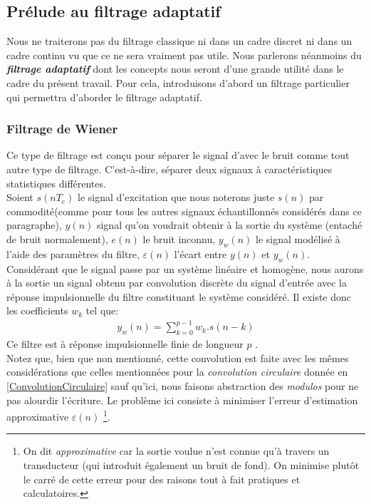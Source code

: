 \subsection{Prélude au filtrage adaptatif}
Nous ne traiterons pas du filtrage classique ni dans un cadre discret ni dans un cadre continu vu que ce ne sera vraiment pas utile. Nous parlerons néanmoins du \textbf{\emph{filtrage adaptatif}} dont les concepts nous seront d'une grande utilité dans le cadre du présent travail. Pour cela, introduisons d'abord un filtrage particulier qui permettra d'aborder le filtrage adaptatif.
\subsubsection{Filtrage de Wiener\cite{Fmy}}
Ce type de filtrage est conçu pour séparer le signal d'avec le bruit comme tout autre type de filtrage. C'est-à-dire, séparer deux signaux à caractéristiques statistiques différentes.\\
Soient $ s(nT_{e}) $ le signal d'excitation que nous noterons juste $ s(n) $ par commodité(comme pour tous les autres signaux échantillonnés considérés dans ce paragraphe), $ y(n) $ signal qu'on voudrait obtenir à la sortie du système (entaché de bruit normalement), $ e(n) $ le bruit inconnu, $ y_{w}(n) $ le signal modélisé à l'aide des paramètres du filtre, $ \varepsilon (n) $ l'écart entre $ y(n) $ et $ y_{w}(n) $.\\
Considérant que le signal passe par un système linéaire et homogène, nous aurons à la sortie un signal obtenu par convolution discrète du signal d'entrée avec la réponse impulsionnelle du filtre constituant le système considéré. Il existe donc les coefficients $ w_{k} $ tel que:
\begin{eqnarray}\label{ConvolutionWiener}
y_{w}(n) = \sum_{k=0}^{p-1}w_{k}.s(n-k)
\end{eqnarray}
Ce filtre est à réponse impulsionnelle finie de longueur $ p $ .\\
Notez que, bien que non mentionné, cette convolution est faite avec les mêmes considérations que celles mentionnées pour la \emph{convolution circulaire} donnée en \ref{ConvolutionCirculaire} sauf qu'ici, nous faisons abstraction des \emph{modulos} pour ne pas alourdir l'écriture. Le problème ici consiste à minimiser l'erreur d'estimation approximative $ \varepsilon (n) $ \footnote{On dit \emph{approximative} car la sortie voulue n'est connue qu'à travers un transducteur (qui introduit également un bruit de fond). On minimise plutôt le carré de cette erreur pour des raisons tout à fait pratiques et calculatoires\cite{Esiee}.}.
